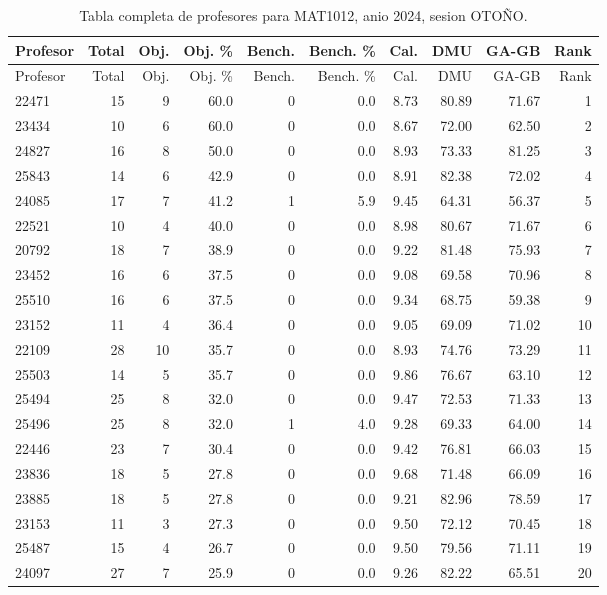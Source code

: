 \begingroup
\scriptsize
\setlength{\tabcolsep}{3pt}
\begin{longtable}{lrrrrrrrrr}
\caption{Tabla completa de profesores para MAT1012, anio 2024, sesion OTOÑO.}\label{tab:prof-period-mat1012-2024-oto-o-especializado}\\
\toprule
Profesor & Total & Obj. & Obj. \% & Bench. & Bench. \% & Cal. & DMU & GA-GB & Rank \\
\midrule
\endfirsthead
\toprule
Profesor & Total & Obj. & Obj. \% & Bench. & Bench. \% & Cal. & DMU & GA-GB & Rank \\
\midrule
\endhead
22471 & 15 & 9 & 60.0 & 0 & 0.0 & 8.73 & 80.89 & 71.67 & 1 \\
23434 & 10 & 6 & 60.0 & 0 & 0.0 & 8.67 & 72.00 & 62.50 & 2 \\
24827 & 16 & 8 & 50.0 & 0 & 0.0 & 8.93 & 73.33 & 81.25 & 3 \\
25843 & 14 & 6 & 42.9 & 0 & 0.0 & 8.91 & 82.38 & 72.02 & 4 \\
24085 & 17 & 7 & 41.2 & 1 & 5.9 & 9.45 & 64.31 & 56.37 & 5 \\
22521 & 10 & 4 & 40.0 & 0 & 0.0 & 8.98 & 80.67 & 71.67 & 6 \\
20792 & 18 & 7 & 38.9 & 0 & 0.0 & 9.22 & 81.48 & 75.93 & 7 \\
23452 & 16 & 6 & 37.5 & 0 & 0.0 & 9.08 & 69.58 & 70.96 & 8 \\
25510 & 16 & 6 & 37.5 & 0 & 0.0 & 9.34 & 68.75 & 59.38 & 9 \\
23152 & 11 & 4 & 36.4 & 0 & 0.0 & 9.05 & 69.09 & 71.02 & 10 \\
22109 & 28 & 10 & 35.7 & 0 & 0.0 & 8.93 & 74.76 & 73.29 & 11 \\
25503 & 14 & 5 & 35.7 & 0 & 0.0 & 9.86 & 76.67 & 63.10 & 12 \\
25494 & 25 & 8 & 32.0 & 0 & 0.0 & 9.47 & 72.53 & 71.33 & 13 \\
25496 & 25 & 8 & 32.0 & 1 & 4.0 & 9.28 & 69.33 & 64.00 & 14 \\
22446 & 23 & 7 & 30.4 & 0 & 0.0 & 9.42 & 76.81 & 66.03 & 15 \\
23836 & 18 & 5 & 27.8 & 0 & 0.0 & 9.68 & 71.48 & 66.09 & 16 \\
23885 & 18 & 5 & 27.8 & 0 & 0.0 & 9.21 & 82.96 & 78.59 & 17 \\
23153 & 11 & 3 & 27.3 & 0 & 0.0 & 9.50 & 72.12 & 70.45 & 18 \\
25487 & 15 & 4 & 26.7 & 0 & 0.0 & 9.50 & 79.56 & 71.11 & 19 \\
24097 & 27 & 7 & 25.9 & 0 & 0.0 & 9.26 & 82.22 & 65.51 & 20 \\

\end{longtable}
